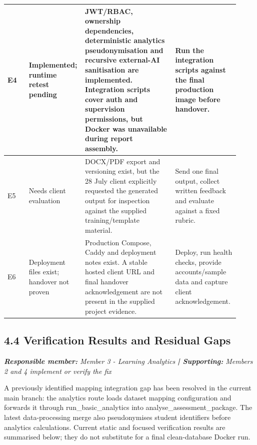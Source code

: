 \documentclass[11pt,a4paper]{article}
\begin{document}
\begin{small}
\begin{longtable}{>{\raggedright\arraybackslash}p{0.098\linewidth}>{\raggedright\arraybackslash}p{0.157\linewidth}>{\raggedright\arraybackslash}p{0.389\linewidth}>{\raggedright\arraybackslash}p{0.275\linewidth}}
E4 & Implemented; runtime retest pending & JWT/\allowbreak{}RBAC, ownership dependencies, deterministic analytics pseudonymisation and recursive external-AI sanitisation are implemented. Integration scripts cover auth and supervision permissions, but Docker was unavailable during report assembly. & Run the integration scripts against the final production image before handover. \\ \hline

E5 & Needs client evaluation & DOCX/\allowbreak{}PDF export and versioning exist, but the 28 July client explicitly requested the generated output for inspection against the supplied training/\allowbreak{}template material. & Send one final output, collect written feedback and evaluate against a fixed rubric. \\ \hline

E6 & Deployment files exist; handover not proven & Production Compose, Caddy and deployment notes exist. A stable hosted client URL and final handover acknowledgement are not present in the supplied project evidence. & Deploy, run health checks, provide accounts/\allowbreak{}sample data and capture client acknowledgement. \\ \hline

\end{longtable}

\end{small}

\subsection*{4.4 Verification Results and Residual Gaps}


\noindent\textit{\textbf{Responsible member: }Member 3 - Learning Analytics\textbf{ | Supporting: }Members 2 and 4 implement or verify the fix}\par

A previously identified mapping integration gap has been resolved in the current main branch: the analytics route loads dataset mapping configuration and forwards it through run\_basic\_analytics into analyse\_assessment\_package. The latest data-processing merge also pseudonymises student identifiers before analytics calculations. Current static and focused verification results are summarised below; they do not substitute for a final clean-database Docker run.\par
\end{document}
